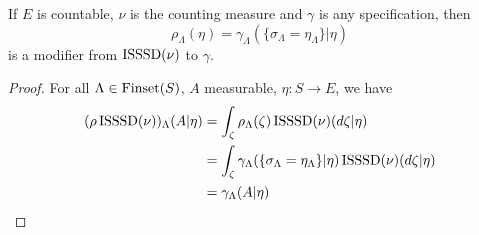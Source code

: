 \begin{lemma}
    \label{lem:exists-modif-isssd}

    If $E$ is countable, $\nu$ is the counting measure and $\gamma$ is any specification, then
    $$\rho_\Lambda(\eta) = \gamma_\Lambda(\{\sigma_\Lambda = \eta_\Lambda\} | \eta)$$
    is a modifier from $\operatorname{ISSSD}(\nu)$ to $\gamma$.
\end{lemma}
\begin{proof}

    For all $\Lambda \in \operatorname{Finset}(S)$, $A$ measurable, $\eta : S \to E$, we have
    \begin{align}
        (\rho\operatorname{ISSSD}(\nu))_\Lambda(A|\eta)
        & = \int_\zeta \rho_\Lambda(\zeta) \operatorname{ISSSD}(\nu)(d\zeta|\eta) \\
        & = \int_\zeta \gamma_\Lambda(\{\sigma_\Lambda = \eta_\Lambda\} | \eta) \operatorname{ISSSD}(\nu)(d\zeta|\eta) \\
        & = \gamma_\Lambda(A|\eta)
    \end{align}
\end{proof}

